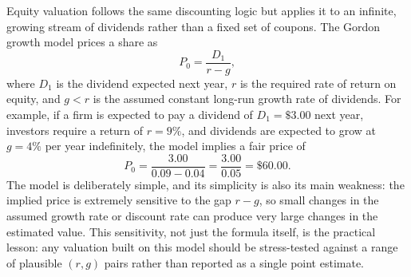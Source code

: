 \documentclass[../ai_in_finance]{subfiles}
\begin{document}
Equity valuation follows the same discounting logic but applies it to an infinite, growing stream of dividends rather than a fixed set of coupons. The Gordon growth model prices a share as
\begin{equation*}
P_0 = \frac{D_1}{r - g},
\end{equation*}
where $D_1$ is the dividend expected next year, $r$ is the required rate of return on equity, and $g < r$ is the assumed constant long-run growth rate of dividends. For example, if a firm is expected to pay a dividend of $D_1 = \$3.00$ next year, investors require a return of $r = 9\%$, and dividends are expected to grow at $g = 4\%$ per year indefinitely, the model implies a fair price of
\begin{equation*}
P_0 = \frac{3.00}{0.09 - 0.04} = \frac{3.00}{0.05} = \$60.00.
\end{equation*}
The model is deliberately simple, and its simplicity is also its main weakness: the implied price is extremely sensitive to the gap $r-g$, so small changes in the assumed growth rate or discount rate can produce very large changes in the estimated value. This sensitivity, not just the formula itself, is the practical lesson: any valuation built on this model should be stress-tested against a range of plausible $(r,g)$ pairs rather than reported as a single point estimate.
\end{document}
